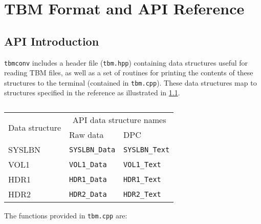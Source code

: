 \documentclass{report}
\begin{document}
\chapter{TBM Format and API Reference}

\section{API Introduction}

\texttt{tbmconv} includes a header file (\texttt{tbm.hpp}) containing data structures useful for reading TBM files, as well as a set of routines for printing the contents of these structures to the terminal (contained in \texttt{tbm.cpp}). These data structures map to structures specified in the reference as illustrated in \cref{Tbl.DataStructures}.

\begin{table}[H]
\centering
\caption{}
\label{Tbl.DataStructures}
\begin{tabular}{lll}
\toprule
\multirow{2}{*}{Data structure} &
\multicolumn{2}{c}{API data structure names} \\
& Raw data & DPC \\
\midrule
SYSLBN & \texttt{SYSLBN\_Data} & \texttt{SYSLBN\_Text} \\
VOL1   & \texttt{VOL1\_Data} & \texttt{VOL1\_Text} \\
HDR1   & \texttt{HDR1\_Data} & \texttt{HDR1\_Text} \\
HDR2   & \texttt{HDR2\_Data} & \texttt{HDR2\_Text} \\
\bottomrule
\end{tabular}
\end{table}

The functions provided in \texttt{tbm.cpp} are:
\end{document}
